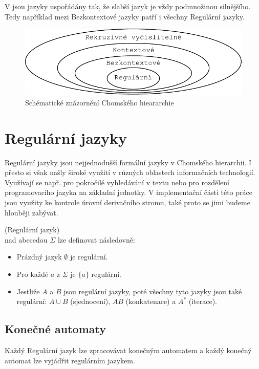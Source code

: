 V  jsou jazyky uspořádány tak, že slabší jazyk je
vždy podmnožinou silnějšího. Tedy například mezi Bezkontextové jazyky patří i
všechny Regulární jazyky.\\

\begin{figure}[H]
  \centering
  \includegraphics{fig/Chomsky.pdf}
  \caption{Schématické znázornění Chomského hieararchie}
\end{figure}

\section{Regulární jazyky}

Regulární jazyky jsou nejjednodušší formální jazyky v Chomského hierarchii.
I přesto si však našly široké využití v různých oblastech informačních technologií.
Využívají se např. pro pokročilé vyhledávání v textu nebo
pro rozdělení programovacího jazyka na základní jednotky.
V implementační části této práce jsou využity ke kontrole úrovní derivačního stromu,
také proto se jimi budeme hlouběji zabývat.

\begin{defn}
  (Regulární jazyk)\\
   nad abecedou $\Sigma$ lze definovat následovně:
  \begin{itemize}
    \item Prázdný jazyk $\emptyset$ je regulární.
    \item Pro každé $a$ z $\Sigma$ je $\{ a \}$ regulární.
    \item Jestliže $A$ a $B$ jsou regulární jazyky, poté všechny tyto jazyky jsou také regulární:
    $A \cup B$ (sjednocení), $AB$ (konkatenace) a $A^*$ (iterace).
  \end{itemize}
\end{defn}

\subsection{Konečné automaty}
Každý Regulární jazyk lze zpracovávat konečným automatem a každý konečný automat
lze vyjádřit regulárním jazykem. \cite{MedunaIFJ}\\


